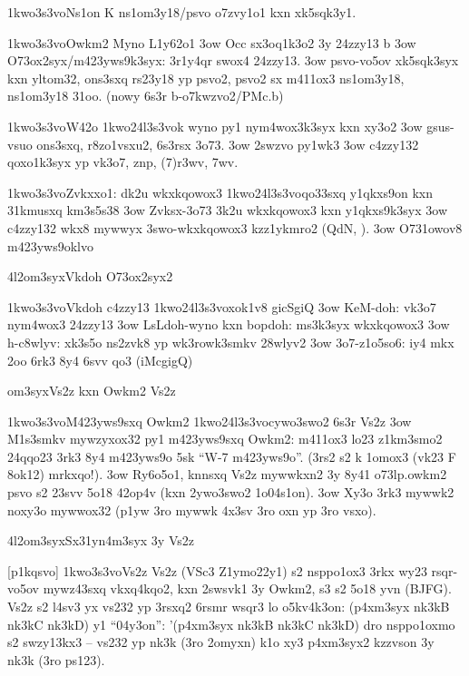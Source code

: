   \p1kwo3s3vo{Ns1on}
  K ns1om3y18/psvo o7zvy1o1 kxn xk5sqk3y1.

  \p1kwo3s3vo{Owkm2 Myno L1y62o1}
  \s3ow Occ sx3oq1k3o2 3y 24zzy13 b
  \s3ow O73ox2syx/m423yws9k3syx: 3r1y4qr swox4 24zzy13.
  \s3ow psvo-vo5ov xk5sqk3syx kxn yltom32, ons3sxq rs23y18 yp psvo2,
    psvo2 sx m411ox3 ns1om3y18, ns1om3y18 31oo.
  (nowy 6s3r b-o7kwzvo2/PMc.b)

  \p1kwo3s3vo{W42o}
  \p1kwo24l3s3vo{k wyno py1 nym4wox3k3syx kxn xy3o2}
  \s3ow gsus-vsuo ons3sxq, r8zo1vsxu2, 6s3rsx 3o73.
  \s3ow 2swzvo py1wk3
  \s3ow c4zzy132 qoxo1k3syx yp vk3o7, znp, (7)r3wv, 7wv.

  \p1kwo3s3vo{Zvkxxo1: dk2u wkxkqowox3}
  \p1kwo24l3s3vo{qo33sxq y1qkxs9on kxn 31kmusxq km3s5s38}
  \s3ow Zvksx-3o73 3k2u wkxkqowox3 kxn y1qkxs9k3syx
  \s3ow c4zzy132 wkx8 mywwyx 3swo-wkxkqowox3 kzz1ykmro2 (QdN, ).
  \s3ow O731owov8 m423yws9oklvo

\24l2om3syx{Vkdoh O73ox2syx2}

  \p1kwo3s3vo{Vkdoh c4zzy13}
  \p1kwo24l3s3vo{xok1v8 gicSgiQ}
  \s3ow KeM-doh: vk3o7 nym4wox3 24zzy13
  \s3ow LsLdoh-wyno kxn bopdoh: ms3k3syx wkxkqowox3
  \s3ow h-c8wlyv: xk3s5o ns2zvk8 yp wk3rowk3smkv 28wlyv2
  \s3ow 3o7-z1o5so6: iy4 mkx 2oo 6rk3 8y4 6svv qo3 (iMcgigQ)

\2om3syx{Vs2z kxn Owkm2 Vs2z}

  \p1kwo3s3vo{M423yws9sxq Owkm2}
  \p1kwo24l3s3vo{cywo3swo2 6s3r Vs2z}
  \s3ow M1s3smkv mywzyxox32 py1 m423yws9sxq Owkm2: m411ox3 lo23
    z1km3smo2 24qqo23 3rk3 8y4 m423yws9o 5sk ``W-7 m423yws9o''. (3rs2
    s2 k 1omox3 (vk23 F 8ok12) mrkxqo!).
  \s3ow Ry6o5o1, knnsxq Vs2z mywwkxn2 3y 8y41 \3o73lp{.owkm2} psvo s2 
    23svv 5o18 42op4v (kxn 2ywo3swo2 1o04s1on).
  \s3ow Xy3o 3rk3 mywwk2 noxy3o mywwox32 (p1yw 3ro mywwk 4x3sv 3ro oxn
    yp 3ro vsxo).

\24l2om3syx{Sx31yn4m3syx 3y Vs2z}

[p1kqsvo]
  \p1kwo3s3vo{Vs2z}
  Vs2z (VSc3 Z1ymo22y1) s2 nsppo1ox3 3rkx wy23 rsqr-vo5ov mywz43sxq
  vkxq4kqo2, kxn 2swsvk1 3y Owkm2, s3 s2 5o18 yvn (BJFG).  Vs2z s2
  l4sv3 yx vs232 yp 3rsxq2 6rsmr wsqr3 lo o5kv4k3on:
(p4xm3syx nk3kB nk3kC nk3kD)
  y1 ``04y3on'':
'(p4xm3syx nk3kB nk3kC nk3kD)
  dro nsppo1oxmo s2 swzy13kx3 -- vs232 yp nk3k (3ro 2omyxn) k1o xy3
  p4xm3syx2 kzzvson 3y nk3k (3ro ps123).

